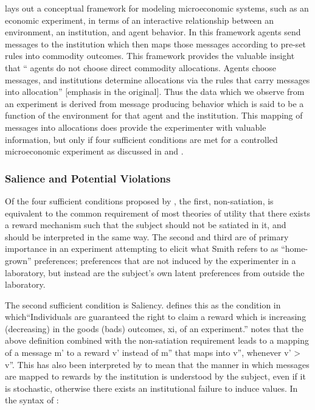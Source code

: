 \textcite{Smith1982} lays out a conceptual framework for modeling microeconomic systems, such as an economic experiment, in terms of an interactive relationship between an environment, an institution, and agent behavior.
In this framework agents send messages to the institution which then maps those messages according to pre-set rules into commodity outcomes.
This framework provides the valuable insight that \enquote{\textelp{} agents do not choose direct commodity allocations.
Agents choose messages, and institutions determine allocations via the rules that carry messages into allocation} [emphasis in the original]\parencite[926]{Smith1982}.
Thus the data which we observe from an experiment is derived from message producing behavior which is said to be a function of the environment for that agent and the institution.
This mapping of messages into allocations does provide the experimenter with valuable information, but only if four sufficient conditions are met for a controlled microeconomic experiment as discussed in \textcite{Smith1982} and \textcite{Harrison1989}.

\subsubsection{Salience and Potential Violations}

Of the four sufficient conditions proposed by \textcite{Smith1982}, the first, non-satiation, is equivalent to the common requirement of most theories of utility that there exists a reward mechanism such that the subject should not be satiated in it, and should be interpreted in the same way.
The second and third are of primary importance in an experiment attempting to elicit what Smith refers to as \enquote{home-grown} preferences; preferences that are not induced by the experimenter in a laboratory, but instead are the subject's own latent preferences from outside the laboratory.


The second sufficient condition is Saliency.
\textcite[931]{Smith1982} defines this as the condition in which\enquote{Individuals are guaranteed the right to claim a reward which is increasing (decreasing) in the goods (bads) outcomes, xi, of an experiment.}
\textcite[223]{Harrison1994} notes that the above definition combined with the non-satiation requirement leads to a mapping of a message m' to a reward v' instead of m'' that maps into v'', whenever v' > v''.
This has also been interpreted by \textcite{Bruner2011} to mean that the manner in which messages are mapped to rewards by the institution is understood by the subject, even if it is stochastic, otherwise there exists an institutional failure to induce values.
In the syntax of \textcite{Smith1982}⁠⁠:

